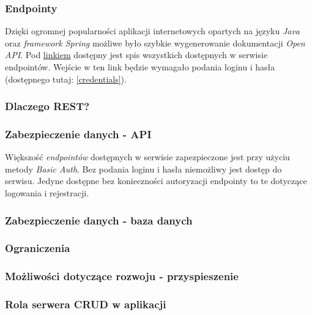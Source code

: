 \subsubsection{Endpointy}
Dzięki ogromnej popularności aplikacji internetowych opartych na języku \textit{Java} oraz \textit{framework Spring} możliwe było szybkie wygenerowanie dokumentacji \textit{Open API}. Pod \href{https://trunk-kartapacjentaservice.herokuapp.com/swagger-ui.html} {linkiem} dostępny jest spis wszystkich dostępnych w serwisie endpointów. Wejście w ten link będzie wymagało podania loginu i hasła (dostępnego tutaj: \ref{credentials}).

\subsubsection{Dlaczego REST?}


\subsubsection{Zabezpieczenie danych - API}
Większość \textit{endpointów} dostępnych w serwisie zapezpieczone jest przy użyciu metody \textit{Basic Auth}. Bez podania loginu i hasła niemożliwy jest dostęp do serwisu. Jedyne dostępne bez konieczności autoryzacji endpointy to te dotyczące logowania i rejestracji.

\subsubsection{Zabezpieczenie danych - baza danych}


\subsubsection{Ograniczenia}
\subsubsection{Możliwości dotyczące rozwoju - przyspieszenie}
\subsubsection{Rola serwera CRUD w aplikacji}